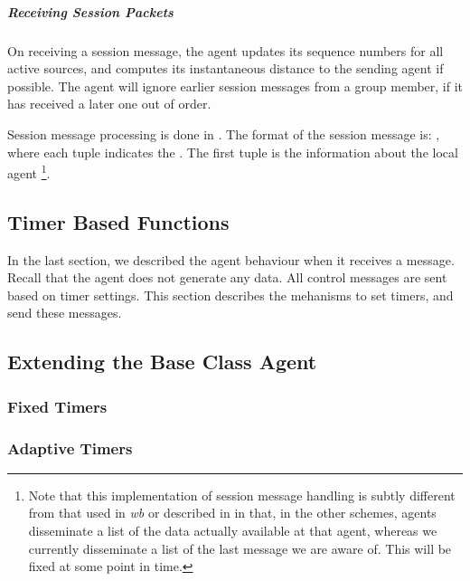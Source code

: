 \documentclass{article}
\begin{document}
\subparagraph{Receiving Session Packets}
On receiving a session message,
the agent updates its sequence numbers for all active sources,
and computes its instantaneous distance to the sending agent if possible.
The agent will ignore earlier session messages from a group member,
if it has received a later one out of order.

Session message processing is done in
.
The format of the session message is:
,
where each tuple indicates the
.
The first tuple is the information about the local agent%
\footnote{Note that this implementation of session message handling
  is subtly different from that used in \emph{wb} or described in
  \cite{Floy95:Reliable} in that, in the other schemes, agents
  disseminate a list of the data actually available at that agent,
  whereas we currently disseminate a list of the last message we are
  aware of.
  This will be fixed at some point in time.}.


\subsection{Timer Based Functions}
\label{sec:timers}

In the last section,
we described the agent behaviour when it receives a message.
Recall that the agent does not generate any data.
All control messages are sent based on timer settings.
This section describes the mehanisms to set timers, and send these messages.



\subsection{Extending the Base Class Agent}
\label{sec:extensions}


\subsubsection{Fixed Timers}


\subsubsection{Adaptive Timers}
\end{document}
